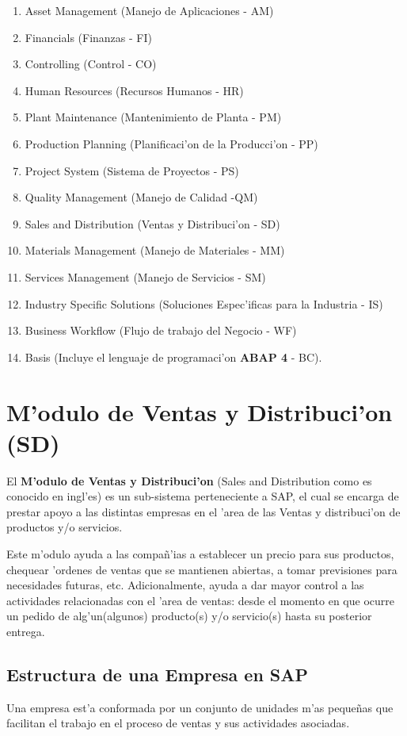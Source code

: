\begin{enumerate}
\item Asset Management (Manejo de Aplicaciones - AM)
\item Financials (Finanzas - FI)
\item Controlling (Control - CO)
\item Human Resources (Recursos Humanos - HR)
\item Plant Maintenance (Mantenimiento de Planta - PM)
\item Production Planning (Planificaci'on de la Producci'on - PP)
\item Project System (Sistema de Proyectos - PS)
\item Quality Management (Manejo de Calidad -QM)
\item Sales and Distribution (Ventas y Distribuci'on - SD)
\item Materials Management (Manejo de Materiales - MM)
\item Services Management (Manejo de Servicios - SM)
\item Industry Specific Solutions (Soluciones Espec'ificas para la Industria - IS)
\item Business Workflow (Flujo de trabajo del Negocio - WF)
\item Basis (Incluye el lenguaje de programaci'on \textbf{ABAP 4} - BC).

\end{enumerate}

\section{M'odulo de Ventas y Distribuci'on (SD)} \label{sect:sd}

El \textbf{M'odulo de Ventas y Distribuci'on} (Sales and Distribution como es conocido en ingl'es) es un sub-sistema perteneciente a SAP, el cual se encarga de prestar apoyo a las distintas empresas en el 'area de las Ventas y distribuci'on de productos y/o servicios. 

Este m'odulo ayuda a las compa\~n'ias a establecer un precio para sus productos, chequear 'ordenes de ventas que se mantienen abiertas, a tomar previsiones para necesidades futuras, etc. Adicionalmente, ayuda a dar mayor control a las actividades relacionadas con el 'area de ventas: desde el momento en que ocurre un pedido de alg'un(algunos) producto(s) y/o servicio(s) hasta su posterior entrega.

\subsection{Estructura de una Empresa en SAP}
Una empresa est'a conformada por un conjunto de unidades m'as peque\~nas que facilitan el trabajo en el proceso de ventas y sus actividades asociadas.

